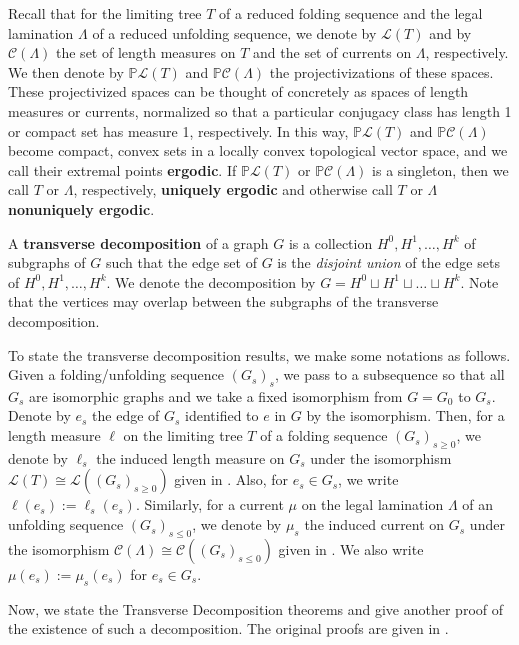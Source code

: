 \documentclass[11pt, letterpaper]{amsart}
\theoremstyle{plain}
\theoremstyle{definition}
\newcommand{\bbP}{\mathbb{P}}
\newcommand{\calC}{\mathcal{C}}
\newcommand{\cL}{\mathcal{L}}
\begin{document}
Recall that for the limiting tree $T$ of a reduced folding sequence and the
legal lamination $\Lambda$ of a reduced unfolding sequence, we denote by
$\cL(T)$ and by $\calC(\Lambda)$ the set of length measures on $T$ and the set
of currents on $\Lambda$, respectively. We then denote by $\bbP\cL(T)$ and
$\bbP\calC(\Lambda)$ the projectivizations of these spaces. These projectivized spaces can
be thought of concretely as spaces of length measures or currents,
normalized so that a particular conjugacy class has length 1 or
compact set has measure 1, respectively. In this way, $\bbP\cL(T)$ and $\bbP\calC(\Lambda)$ become compact, convex
sets in a locally convex topological vector space,
and we call their extremal points \textbf{ergodic}. If
$\bbP\cL(T)$ or $\bbP\calC(\Lambda)$ is a singleton, then we call $T$ or $\Lambda$, respectively,
\textbf{uniquely ergodic} and otherwise call $T$ or $\Lambda$ \textbf{nonuniquely ergodic}.

A \textbf{transverse decomposition} of a graph $G$ is a collection 
$H^0,H^1,\ldots,H^k$ of subgraphs of $G$ such that the edge set of $G$ is the \emph{disjoint union} of
the edge sets of $H^0,H^1,\ldots,H^k$. We denote the decomposition by $G =
H^0\sqcup H^1\sqcup\ldots \sqcup H^k$. Note that the vertices may overlap between the subgraphs
of the transverse decomposition. 

To state the transverse decomposition
results, we make some notations as follows.
Given a folding/unfolding sequence $(G_s)_s$, we
pass to a subsequence so that all $G_s$ are isomorphic graphs and we
take a fixed isomorphism from $G=G_0$ to $G_s$. Denote
by $e_s$ the edge of $G_s$ identified to $e$ in $G$ by the isomorphism. Then, for
a length measure $\ell$ on the limiting tree $T$ of a folding sequence $(G_s)_{s \ge
  0}$, we denote by $\ell_s$ the induced length measure on $G_s$ under the
isomorphism $\cL(T) \cong \cL((G_s)_{s \ge 0})$ given in
. Also, for $e_s \in G_s$, we write
$\ell(e_s):=\ell_s(e_s)$.
Similarly, for a current $\mu$ on the legal lamination $\Lambda$ of an unfolding
sequence $(G_s)_{s \le 0}$, we denote by $\mu_s$ the induced current on $G_s$
under the isomorphism $\calC(\Lambda) \cong \calC((G_s)_{s \le 0})$ given in
. We also write $\mu(e_s):=\mu_s(e_s)$ for $e_s \in
G_s$.

Now, we state the Transverse Decomposition theorems and give another proof of
the existence of such a decomposition. The original proofs are given in
\cite[Theorems 4.7, 5.6]{NPR2014}.
\end{document}
